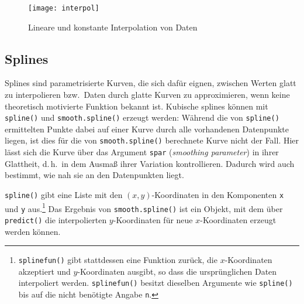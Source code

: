 \begin{figure}[ht]
\centering
\texttt{[image: interpol]}
\vspace*{-1.5em}
\caption{Lineare und konstante Interpolation von Daten}
\label{fig:interpol}
\end{figure}

\subsection{Splines}
\label{sec:splines}

Splines sind parametrisierte Kurven, die sich dafür eignen, zwischen Werten glatt zu interpolieren bzw.\ Daten durch glatte Kurven zu approximieren, wenn keine theoretisch motivierte Funktion bekannt ist. Kubische splines können mit \lstinline!spline()! und \lstinline!smooth.spline()! erzeugt werden: Während die von \lstinline!spline()! ermittelten Punkte dabei auf einer Kurve durch alle vorhandenen Datenpunkte liegen, ist dies für die von \lstinline!smooth.spline()! berechnete Kurve nicht der Fall. Hier lässt sich die Kurve über das Argument \lstinline!spar! (\emph{smoothing parameter}) in ihrer Glattheit, d.\,h.\ in dem Ausmaß ihrer Variation kontrollieren. Dadurch wird auch bestimmt, wie nah sie an den Datenpunkten liegt.

\lstinline!spline()! gibt eine Liste mit den $(x, y)$-Koordinaten in den Komponenten \lstinline!x! und \lstinline!y! aus.\footnote{\lstinline!splinefun()! gibt stattdessen eine Funktion zurück, die $x$-Koordinaten akzeptiert und $y$-Koordinaten ausgibt, so dass die ursprünglichen Daten interpoliert werden. \lstinline!splinefun()! besitzt dieselben Argumente wie \lstinline!spline()! bis auf die nicht benötigte Angabe \lstinline!n!.} Das Ergebnis von \lstinline!smooth.spline()! ist ein Objekt, mit dem über \lstinline!predict()! die interpolierten $y$-Koordinaten für neue $x$-Koordinaten erzeugt werden können.

